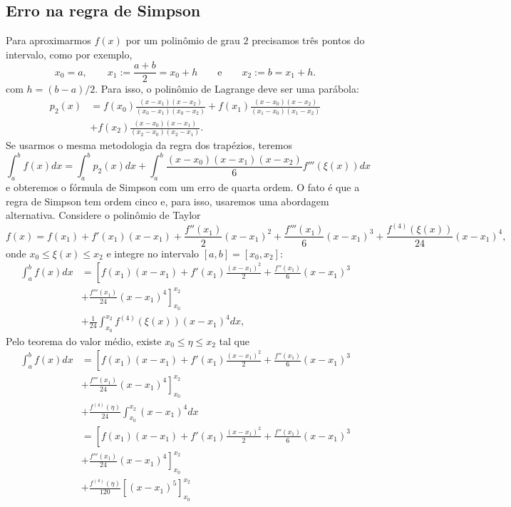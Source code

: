 \subsection{Erro na regra de Simpson}
Para aproximarmos $f(x)$ por um polinômio de grau $2$ precisamos três pontos do intervalo, como por exemplo,
$$
x_0=a,\qquad x_1:=\frac{a+b}{2}=x_0+h \qquad \text{e}\qquad x_2:=b=x_1+h.
$$
com $h = (b-a)/2$. Para isso, o polinômio de Lagrange deve ser uma parábola:
\begin{equation*}
  \begin{split}
    p_2(x) &= f(x_0)\frac{(x-x_1)(x-x_2)}{(x_0-x_1)(x_0-x_2)} + f(x_1)\frac{(x-x_0)(x-x_2)}{(x_1-x_0)(x_1-x_2)}\\
    &+ f(x_2)\frac{(x-x_0)(x-x_1)}{(x_2-x_0)(x_2-x_1)}.
  \end{split}
\end{equation*}
Se usarmos o mesma metodologia da regra dos trapézios, teremos
$$
\int_a^bf(x)dx=\int_a^bp_2(x)dx+\int_a^b\frac{(x-x_0)(x-x_1)(x-x_2)}{6}f'''(\xi(x))dx
$$
e obteremos o fórmula de Simpson com um erro de quarta ordem. O fato é que a regra de Simpson tem ordem cinco e, para isso, usaremos uma abordagem alternativa. Considere o polinômio de Taylor
$$
f(x)=f(x_1)+f'(x_1)(x-x_1)+\frac{f''(x_1)}{2}(x-x_1)^2+\frac{f'''(x_1)}{6}(x-x_1)^3+\frac{f^{(4)}(\xi(x))}{24}(x-x_1)^4,
$$
onde $x_0\leq\xi(x)\leq x_2$ e integre no intervalo $[a,b]=[x_0,x_2]$:
\begin{equation*}
  \begin{split}
    \int_a^bf(x)dx&= \left[f(x_1)(x-x_1)+f'(x_1)\frac{(x-x_1)^2}{2} + \frac{f''(x_1)}{6}(x-x_1)^3\right. \\
      &\left. + \frac{f'''(x_1)}{24}(x-x_1)^4\right]_{x_0}^{x_2}\\
      &+ \frac{1}{24}\int_{x_0}^{x_2}f^{(4)}(\xi(x))(x-x_1)^4dx,    
  \end{split}
\end{equation*}
Pelo teorema do valor médio, existe $x_0\leq\eta\leq x_2$ tal que
\begin{equation*}
  \begin{split}
    \int_a^bf(x)dx&= \left[f(x_1)(x-x_1)+f'(x_1)\frac{(x-x_1)^2}{2}+\frac{f''(x_1)}{6}(x-x_1)^3\right.\\
    &+\left.\frac{f'''(x_1)}{24}(x-x_1)^4\right]_{x_0}^{x_2}\\
    &+ \frac{f^{(4)}(\eta)}{24}\int_{x_0}^{x_2}(x-x_1)^4dx\\
    &= \left[f(x_1)(x-x_1)+f'(x_1)\frac{(x-x_1)^2}{2}+\frac{f''(x_1)}{6}(x-x_1)^3\right.\\
    &+\left.\frac{f'''(x_1)}{24}(x-x_1)^4\right]_{x_0}^{x_2}\\
    &+ \frac{f^{(4)}(\eta)}{120}\left[(x-x_1)^5\right]_{x_0}^{x_2}    
  \end{split}
\end{equation*}
